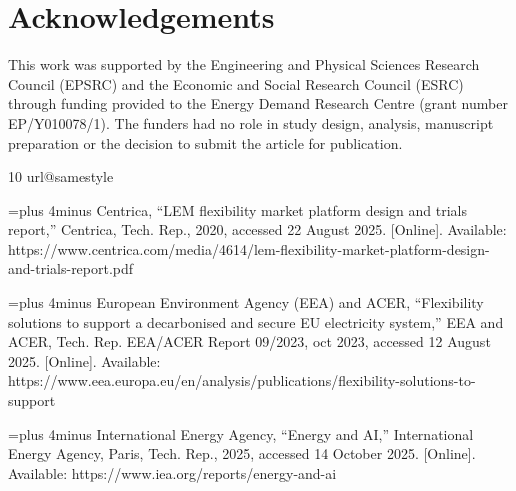 \documentclass[lettersize,journal]{IEEEtran}
\begin{document}
\section*{Acknowledgements}
This work was supported by the Engineering and Physical Sciences Research Council (EPSRC) and the Economic and Social Research Council (ESRC) through funding provided to the Energy Demand Research Centre (grant number EP/Y010078/1). The funders had no role in study design, analysis, manuscript preparation or the decision to submit the article for publication.

\begin{thebibliography}{10}
\providecommand{\url}[1]{#1}
\csname url@samestyle\endcsname
\providecommand{\newblock}{\relax}
\providecommand{\bibinfo}[2]{#2}
\providecommand{\BIBentrySTDinterwordspacing}{\spaceskip=0pt\relax}
\providecommand{\BIBentryALTinterwordstretchfactor}{4}
\providecommand{\BIBentryALTinterwordspacing}{\spaceskip=\fontdimen2\font plus
\BIBentryALTinterwordstretchfactor\fontdimen3\font minus
  \fontdimen4\font\relax}
\providecommand{\BIBforeignlanguage}[2]{{%
\expandafter\ifx\csname l@#1\endcsname\relax
\typeout{** WARNING: IEEEtran.bst: No hyphenation pattern has been}%
\typeout{** loaded for the language `#1'. Using the pattern for}%
\typeout{** the default language instead.}%
\else
\language=\csname l@#1\endcsname
\fi
#2}}
\providecommand{\BIBdecl}{\relax}
\BIBdecl

\BIBentryALTinterwordspacing
Centrica, ``{LEM flexibility market platform design and trials report},''
  Centrica, Tech. Rep., 2020, accessed 22 August 2025. [Online]. Available:
  \url{https://www.centrica.com/media/4614/lem-flexibility-market-platform-design-and-trials-report.pdf}
\BIBentrySTDinterwordspacing

\BIBentryALTinterwordspacing
{European Environment Agency (EEA) and ACER}, ``{Flexibility solutions to
  support a decarbonised and secure EU electricity system},'' EEA and ACER,
  Tech. Rep. EEA/ACER Report 09/2023, oct 2023, accessed 12 August 2025.
  [Online]. Available:
  \url{https://www.eea.europa.eu/en/analysis/publications/flexibility-solutions-to-support}
\BIBentrySTDinterwordspacing

\BIBentryALTinterwordspacing
{International Energy Agency}, ``{Energy and {AI}},'' {International Energy
  Agency}, Paris, Tech. Rep., 2025, accessed 14 October 2025. [Online].
  Available: \url{https://www.iea.org/reports/energy-and-ai}
\BIBentrySTDinterwordspacing


\end{thebibliography}
\end{document}
